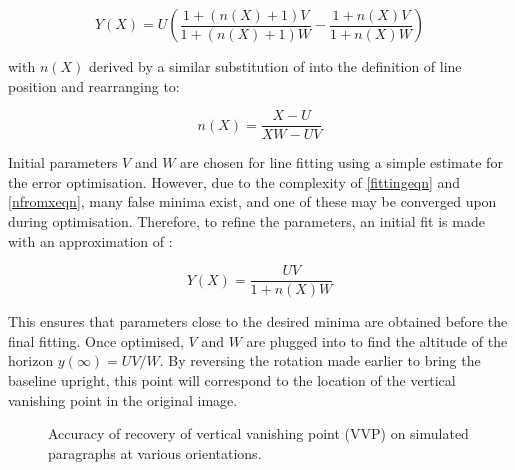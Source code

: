 \begin{equation}
Y(X) = U ( \frac{1+(n(X)+1)V}{1+(n(X)+1)W} - \frac{1+n(X)V}{1+n(X)W} )
\label{fittingeqn}
\end{equation}

{\parindent 0mm
with $n(X)$ derived by a similar substitution of  into the definition of line position  and rearranging to:
}

\begin{equation}
n(X) = \frac{X-U}{XW-UV}
\label{nfromxeqn}
\end{equation}

Initial parameters $V$ and $W$ are chosen for line fitting using a simple estimate for the error optimisation.
However, due to the complexity of \ref{fittingeqn} and \ref{nfromxeqn}, many false minima exist, and one of these may be converged upon during optimisation.
Therefore, to refine the parameters, an initial fit is made with an approximation of :

\begin{equation}
Y(X) = \frac{ UV }{ 1+n(X)W }
\end{equation}

This ensures that parameters close to the desired minima are obtained before the final fitting.  Once optimised, $V$ and $W$ are plugged into  to find the altitude of the horizon $y(\infty) = UV/W$.
By reversing the rotation made earlier to bring the baseline upright, this point will correspond to the location of the vertical vanishing point in the original image.

\begin{figure}[t]
\begin{centering}
	\hspace{2mm}
\caption{Accuracy of recovery of vertical vanishing point (VVP) on simulated paragraphs at various orientations.}
\label{vvpaccuracy}
\end{centering}
\end{figure}

